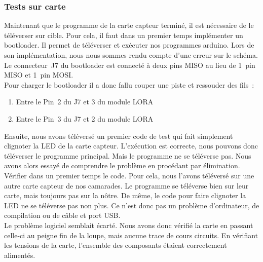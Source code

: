             \subsubsection{Tests sur carte}
                Maintenant que le programme de la carte capteur terminé, il est nécessaire de le téléverser sur cible. Pour cela, il faut dans un premier temps implémenter un bootloader. Il permet de téléverser et exécuter nos programmes arduino. Lors de son implémentation, nous nous sommes rendu compte d’une erreur sur le schéma. Le connecteur~J7 du 
                bootloader est connecté à deux pins MISO au lieu de 1~pin MISO et 1~pin MOSI.  \\

                \noindent
                Pour charger le bootloader il a donc fallu couper une piste et ressouder des fils~:
                
                \begin{enumerate}
                    \item Entre le Pin~2 du J7 et 3 du module LORA  
                    \item Entre le Pin~3 du J7 et 2 du module LORA \\
                \end{enumerate}

                Ensuite, nous avons téléversé un premier code de test qui fait simplement clignoter la LED de la carte capteur. L’exécution est correcte, nous pouvons donc téléverser le programme principal. Mais le programme ne se téléverse pas.
                Nous avons alors essayé de comprendre le problème en procédant par élimination. \\
                Vérifier dans un premier temps le code. Pour cela, nous l’avons téléversé sur une autre carte capteur de nos camarades. Le programme se téléverse bien sur leur carte, mais toujours pas sur la nôtre. 
                De même, le code pour faire clignoter la LED ne se téléverse pas non plus. Ce n’est donc pas un problème d’ordinateur, de compilation ou de câble et port USB. \\
                Le problème logiciel semblait écarté. Nous avons donc vérifié la carte en passant celle-ci au peigne fin de la loupe, mais aucune trace de cours circuits. En vérifiant les tensions de la carte, l’ensemble des composants étaient correctement alimentés. \\

